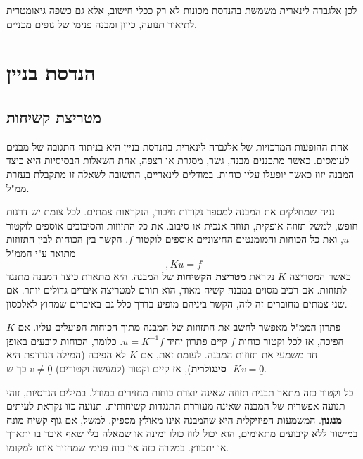 \documentclass[12pt]{report}
\theoremstyle{plain}
\theoremstyle{definition}
\newcommand{\0}{\mathbf{0}}
\begin{document}
לכן אלגברה לינארית משמשת בהנדסת מכונות לא רק ככלי חישוב, אלא גם כשפה גיאומטרית לתיאור תנועה, כיוון ומבנה פנימי של גופים מכניים.

\section{הנדסת בניין}
\subsection*{מטריצת קשיחות}

אחת ההופעות המרכזיות של אלגברה לינארית בהנדסת בניין היא בניתוח התגובה של מבנים לעומסים.
כאשר מתכננים מבנה, גשר, מסגרת או רצפה, אחת השאלות הבסיסיות היא כיצד המבנה יזוז כאשר יופעלו עליו כוחות. במודלים לינאריים, התשובה לשאלה זו מתקבלת בעזרת ממ"ל.

נניח שמחלקים את המבנה למספר נקודות חיבור, הנקראות צמתים.
לכל צומת יש דרגות חופש, למשל תזוזה אופקית, תזוזה אנכית או סיבוב.
את כל התזוזות והסיבובים אוספים לוקטור 
$u$,
ואת כל הכוחות והמומנטים החיצוניים אוספים לוקטור
$f$.
הקשר בין הכוחות לבין התזוזות מתואר ע"י הממ"ל
$$
,K u = f
$$
כאשר המטריצה
$K$
נקראת
\textbf{מטריצת הקשיחות}
של המבנה. היא מתארת כיצד המבנה מתנגד לתזוזות.
אם רכיב מסוים במבנה קשיח מאוד, הוא תורם למטריצה איברים גדולים יותר.
אם שני צמתים מחוברים זה לזה, הקשר ביניהם מופיע בדרך כלל גם באיברים שמחוץ לאלכסון.

פתרון הממ"ל מאפשר לחשב את התזוזות של המבנה מתוך הכוחות הפועלים עליו. אם
$K$
הפיכה, אז לכל וקטור כוחות
$f$
קיים פתרון יחיד
$u=K^{-1}f$.
כלומר, הכוחות קובעים באופן חד-משמעי את תזוזות המבנה.
לעומת זאת, אם
$K$
לא הפיכה (המילה הנרדפת היא
\textbf{סינגולרית}),
אז קיים וקטור (למעשה וקטורים)
$v \neq \underline{0}$
כך ש-
$K v=\underline{0}$.

כל וקטור כזה מתאר תבנית תזוזה שאינה יוצרת כוחות מחזירים במודל.
במילים הנדסיות, זוהי תנועה אפשרית של המבנה שאינה מעוררת התנגדות קשיחותית.
תנועה כזו נקראת לעיתים \textbf{מנגנון}. 
המשמעות הפיזיקלית היא שהמבנה אינו מאולץ מספיק. למשל, אם גוף קשיח מונח במישור ללא קיבועים מתאימים, הוא יכול לזוז כולו ימינה או שמאלה בלי שאף איבר בו יתארך או יתכווץ. במקרה כזה אין כוח פנימי שמחזיר אותו למקומו.
\end{document}
